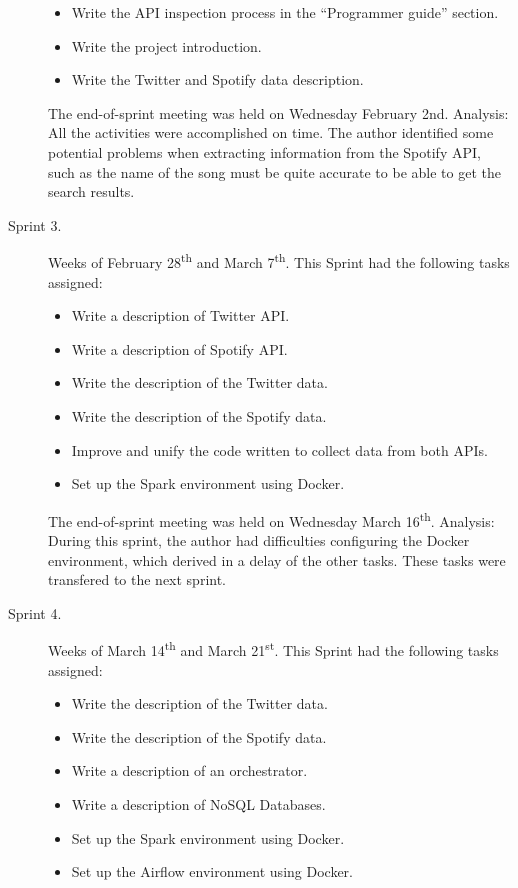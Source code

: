 \begin{description}
\begin{itemize}
		\item Write the API inspection process in the ``Programmer guide'' section.
		\item Write the project introduction.
		\item Write the Twitter and Spotify data description.
	\end{itemize}
	The end-of-sprint meeting was held on Wednesday February 2nd.
	Analysis: All the activities were accomplished on time. The author identified some potential problems when extracting information from the Spotify API, such as the name of the song must be quite accurate to be able to get the search results.
	\item[Sprint 3.] Weeks of February 28\textsuperscript{th} and March 7\textsuperscript{th}. This Sprint had the following tasks assigned:
	\begin{itemize}		
		\item Write a description of Twitter API.
		\item Write a description of Spotify API.
		\item Write the description of the Twitter data.
		\item Write the description of the Spotify data.
		\item Improve and unify the code written to collect data from both APIs.
		\item Set up the Spark environment using Docker.
	\end{itemize}
	The end-of-sprint meeting was held on Wednesday March 16\textsuperscript{th}.
	Analysis: During this sprint, the author had difficulties configuring the Docker environment, which derived in a delay of the other tasks. These tasks were transfered to the next sprint.
	\item[Sprint 4.] Weeks of March 14\textsuperscript{th} and March 21\textsuperscript{st}. This Sprint had the following tasks assigned:
	\begin{itemize}
		\item Write the description of the Twitter data.
		\item Write the description of the Spotify data.
		\item Write a description of an orchestrator.
		\item Write a description of NoSQL Databases.
		\item Set up the Spark environment using Docker.
		\item Set up the Airflow environment using Docker.
	\end{itemize}

\end{description}
